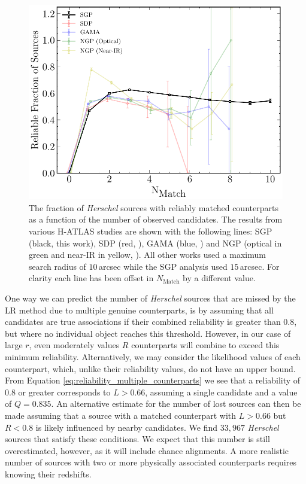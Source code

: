 \begin{figure}
    \centering
    \includegraphics[width=0.75\columnwidth]{Figures/multiplicity.pdf}
    \caption[Reliable fraction of sources as a function of the number of candidates]{The fraction of \textit{Herschel} sources with reliably matched counterparts as a function of the number of observed candidates. The results from various H-ATLAS studies are shown with the following lines: SGP (black, this work), SDP (red, \citealt{Smith_2011}), GAMA (blue, \citealt{Bourne_2016}) and NGP (optical in green and near-IR in yellow, \citealt{Furlanetto_2018}). All other works used a maximum search radius of $10\,$arcsec while the SGP analysis used $15\,$arcsec. For clarity each line has been offset in $N_{\textrm{Match}}$ by a different value.}
    \label{fig:multiplicity}
\end{figure}

One way we can predict the number of \textit{Herschel} sources that are missed by the LR method due to multiple genuine counterparts, is by assuming that all candidates are true associations if their combined reliability is greater than $0.8$, but where no individual object reaches this threshold. However, in our case of large $r$, even moderately values $R$ counterparts will combine to exceed this minimum reliability. Alternatively, we may consider the likelihood values of each counterpart, which, unlike their reliability values, do not have an upper bound. From Equation \ref{eq:reliability_multiple_counterparts} we see that a reliability of $0.8$ or greater corresponds to $L > 0.66$, assuming a single candidate and a value of $Q = 0.835$. An alternative estimate for the number of lost sources can then be made assuming that a source with a matched counterpart with $L > 0.66$ but $R < 0.8$ is likely influenced by nearby candidates. We find $33,967$ \textit{Herschel} sources that satisfy these conditions. We expect that this number is still overestimated, however, as it will include chance alignments. A more realistic number of sources with two or more physically associated counterparts requires knowing their redshifts.

